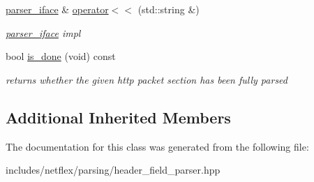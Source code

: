 \begin{DoxyCompactItemize}
\mbox{\label{classnetflex_1_1parsing_1_1header__field__parser_acdb399c2199106c99a2fcb4db1fbebca}} 
\hyperlink{classnetflex_1_1parsing_1_1parser__iface}{parser\+\_\+iface} \& \hyperlink{classnetflex_1_1parsing_1_1header__field__parser_acdb399c2199106c99a2fcb4db1fbebca}{operator$<$$<$} (std\+::string \&)
\begin{DoxyCompactList}\small\item\em \hyperlink{classnetflex_1_1parsing_1_1parser__iface}{parser\+\_\+iface} impl \end{DoxyCompactList}\item 
\mbox{\label{classnetflex_1_1parsing_1_1header__field__parser_a59cc97a4d2104217d23a4d54a31f072f}} 
bool \hyperlink{classnetflex_1_1parsing_1_1header__field__parser_a59cc97a4d2104217d23a4d54a31f072f}{is\+\_\+done} (void) const
\begin{DoxyCompactList}\small\item\em returns whether the given http packet section has been fully parsed \end{DoxyCompactList}\end{DoxyCompactItemize}
\subsection*{Additional Inherited Members}


The documentation for this class was generated from the following file\+:\begin{DoxyCompactItemize}
\item 
includes/netflex/parsing/header\+\_\+field\+\_\+parser.\+hpp\end{DoxyCompactItemize}

